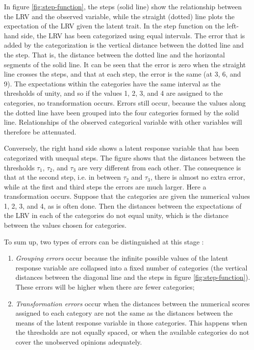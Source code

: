 \documentclass[a4paper,12pt]{article}
\begin{document}
In figure \ref{fig:step-function}, the steps (solid line) show the relationship between the LRV and the observed variable, while the straight (dotted) line plots the expectation of the LRV given the latent trait. In the step function on the left-hand side, the LRV has been categorized using equal intervals. The error that is added by the categorization is the vertical distance between the dotted line and the step. That is, the distance between the dotted line and the horizontal segments of the solid line. It can be seen that the error is zero when the straight line crosses the steps, and that at each step, the error is the same (at 3, 6, and 9). The expectations within the categories have the same interval as the thresholds of unity, and so if the values 1, 2, 3, and 4 are assigned to the categories, no transformation occurs. Errors still occur, because the values along the dotted line have been grouped into the four categories formed by the solid line. Relationships of the observed categorical variable with other variables will therefore be attenuated.



Conversely, the right hand side shows a latent response variable that has been categorized with unequal steps. The figure shows that the distances between the thresholds $\tau_1$, $\tau_2$, and $\tau_3$ are very different from each other. The consequence is that at the second step, i.e. in between $\tau_2$ and $\tau_3$, there is almost no extra error, while at the first and third steps the errors are much larger. Here a transformation occurs. Suppose that the categories are given the numerical values 1, 2, 3, and 4, as is often done. Then the distances between the expectations of the LRV in each of the categories do not equal unity, which is the distance between the values chosen for categories.

To sum up, two types of errors can be distinguished at this stage \citep{johnson_ordinal_1983}:
\begin{enumerate}
\item \emph{Grouping errors} occur because the infinite possible values of the latent response variable are collapsed into a fixed number of categories (the vertical distances between the diagonal line and the steps in figure \ref{fig:step-function}). These errors will be higher when there are fewer categories;
\item \emph{Transformation errors} occur when the distances between the numerical scores assigned to each category are not the same as the distances between the means of the latent response variable in those categories. This happens when the thresholds are not equally spaced, or when the available categories do not cover the unobserved opinions adequately. 
\end{enumerate}
\end{document}
